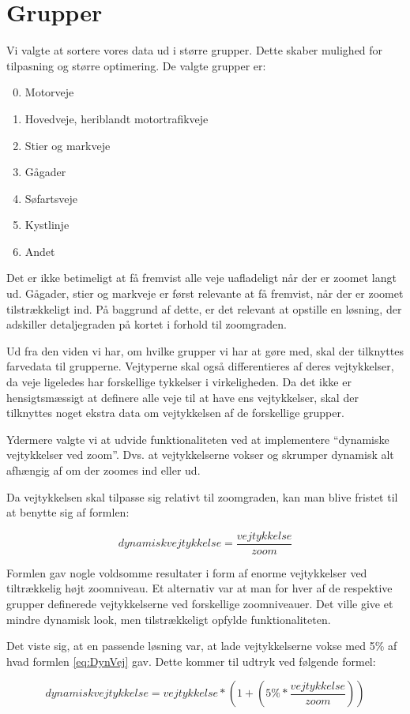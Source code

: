 \section{Grupper}
Vi valgte at sortere vores data ud i større grupper. Dette skaber mulighed for tilpasning og større optimering. De valgte grupper er:
\begin{enumerate}
\setcounter{enumi}{-1}
	\item Motorveje
	\item Hovedveje, heriblandt motortrafikveje
	\item Stier og markveje
	\item Gågader
	\item Søfartsveje
	\item Kystlinje
	\item Andet
\end{enumerate}

Det er ikke betimeligt at få fremvist alle veje uafladeligt når der er zoomet langt ud. Gågader, stier og markveje er først relevante at få fremvist, når der er zoomet tilstrækkeligt ind. På baggrund af dette, er det relevant at opstille en løsning, der adskiller detaljegraden på kortet i forhold til zoomgraden.

Ud fra den viden vi har, om hvilke grupper vi har at gøre med, skal der tilknyttes farvedata til grupperne. Vejtyperne skal også differentieres af deres vejtykkelser, da veje ligeledes har forskellige tykkelser i virkeligheden. Da det ikke er hensigtsmæssigt at definere alle veje til at have ens vejtykkelser, skal der tilknyttes noget ekstra data om vejtykkelsen af de forskellige grupper.

Ydermere valgte vi at udvide funktionaliteten ved at implementere ``dynamiske vejtykkelser ved zoom''. Dvs. at vejtykkelserne vokser og skrumper dynamisk alt afhængig af om der zoomes ind eller ud.

Da vejtykkelsen skal tilpasse sig relativt til zoomgraden, kan man blive fristet til at benytte sig af formlen:

\begin{equation}
	dynamisk vejtykkelse = \frac{vejtykkelse}{zoom}
	\label{eq:DynVej}
\end{equation}

Formlen gav nogle voldsomme resultater i form af enorme vejtykkelser ved tiltrækkelig højt zoomniveau. Et alternativ var at man for hver af de respektive grupper definerede vejtykkelserne ved forskellige zoomniveauer. Det ville give et mindre dynamisk look, men tilstrækkeligt opfylde funktionaliteten. 

Det viste sig, at en passende løsning var, at lade vejtykkelserne vokse med 5\% af hvad formlen \ref{eq:DynVej} gav. Dette kommer til udtryk ved følgende formel:  

\begin{equation}
	dynamisk vejtykkelse = vejtykkelse * (1+ ( 5\% * \frac{vejtykkelse}{zoom}))
\end{equation}

